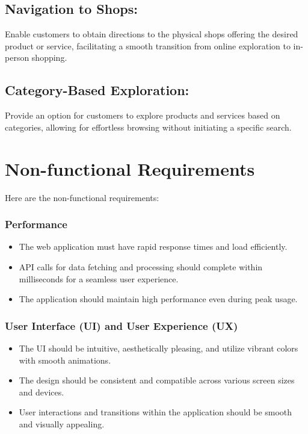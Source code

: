 \subsection{Navigation to Shops:}
Enable customers to obtain directions to the physical shops offering the desired product or service, facilitating a smooth transition from online exploration to in-person shopping.

\subsection{Category-Based Exploration:}
Provide an option for customers to explore products and services based on categories, allowing for effortless browsing without initiating a specific search.



\section{Non-functional Requirements}
Here are the non-functional requirements:

\subsubsection{Performance}
\begin{itemize}
	\item The web application must have rapid response times and load efficiently.
	\item API calls for data fetching and processing should complete within milliseconds for a seamless user experience.
	\item The application should maintain high performance even during peak usage.
\end{itemize}

\subsubsection{User Interface (UI) and User Experience (UX)}
\begin{itemize}
	\item The UI should be intuitive, aesthetically pleasing, and utilize vibrant colors with smooth animations.
	\item The design should be consistent and compatible across various screen sizes and devices.
	\item User interactions and transitions within the application should be smooth and visually appealing.
\end{itemize}

